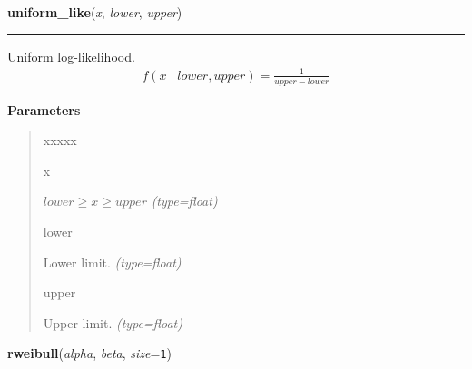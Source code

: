     \begin{boxedminipage}{\textwidth}

    \raggedright \textbf{uniform\_like}(\textit{x}, \textit{lower}, \textit{upper})

    \vspace{-1.5ex}

    \rule{\textwidth}{0.5\fboxrule}

Uniform log-likelihood.
\begin{equation*}\begin{split}f(x \mid lower, upper) = \frac{1}{upper-lower}\end{split}\end{equation*}    \vspace{1ex}

      \textbf{Parameters}
      \begin{quote}
        \begin{Ventry}{xxxxx}

          \item[x]


$lower \geq x \geq upper$
            \textit{(type=float)}

          \item[lower]


Lower limit.
            \textit{(type=float)}

          \item[upper]


Upper limit.
            \textit{(type=float)}

        \end{Ventry}

      \end{quote}

    \vspace{1ex}

    \end{boxedminipage}

    \label{pymc:distributions:rweibull}

    \vspace{0.5ex}

    \begin{boxedminipage}{\textwidth}

    \raggedright \textbf{rweibull}(\textit{alpha}, \textit{beta}, \textit{size}=\texttt{1})

    \end{boxedminipage}

